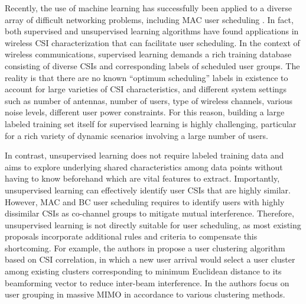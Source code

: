 Recently, the use of machine learning has successfully been applied to a diverse 
array of difficult networking problems, including MAC user scheduling \cite{Kaufman90, Cui18, Morocho19, Xu14}. In fact, both supervised and unsupervised learning 
algorithms have found applications in wireless CSI characterization \cite{Jiang17} that 
can facilitate user scheduling. 
In the context of wireless communications, supervised learning 
demands a rich training database consisting of diverse CSIs and 
corresponding labels of scheduled user groups. The reality is
that there are no known ``optimum scheduling''
labels in existence to account for 
large varieties of CSI characteristics, 
and different system settings such as
number of antennas, number of users, 
type of wireless channels, various noise
levels, different user power constraints.
For this reason, building a large labeled training
set itself for supervised learning is highly challenging,
particular for a rich variety of dynamic scenarios involving
a large number of users. 

In contrast, unsupervised learning does not require labeled training data and 
aims to explore underlying shared characteristics among data points
without having to know beforehand which are vital features to extract. 
Importantly, unsupervised learning can effectively identify user CSIs that are highly similar. 
However, MAC and BC user scheduling requires to identify users with highly dissimilar CSIs as co-channel groups to mitigate 
mutual interference. Therefore, unsupervised learning 
is not directly suitable for user scheduling, as most existing 
proposals incorporate additional rules and criteria to compensate
this shortcoming. 
For example, the authors in \cite{Cui18} propose a user clustering algorithm based on CSI correlation, in which a new user arrival would select a user cluster among existing clusters corresponding to minimum Euclidean distance to its beamforming vector to reduce inter-beam interference.
In \cite{Xu14} the authors focus on user grouping in massive MIMO in accordance to various clustering methods. 

